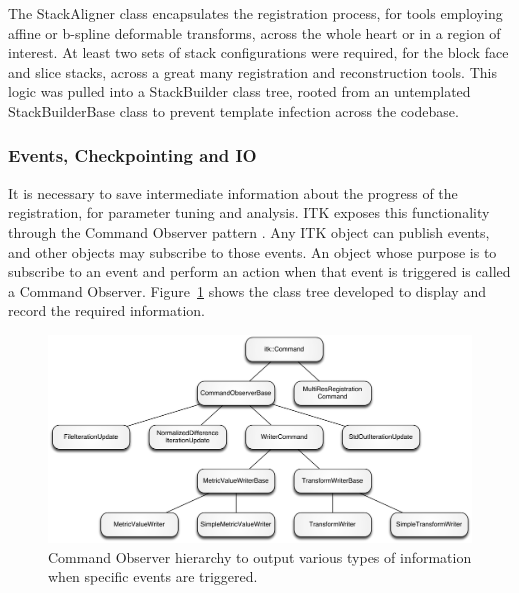 			The StackAligner class encapsulates the registration process, for tools employing affine or b-spline deformable transforms, across the whole heart or in a region of interest. At least two sets of stack configurations were required, for the block face and slice stacks, across a great many registration and reconstruction tools. This logic was pulled into a StackBuilder class tree, rooted from an untemplated StackBuilderBase class to prevent template infection across the codebase.
		
		\subsubsection{Events, Checkpointing and IO} %
		\label{ssub:events_checkpointing_and_io}
			It is necessary to save intermediate information about the progress of the registration, for parameter tuning and analysis. ITK exposes this functionality through the Command Observer pattern \cite{Gamma1995}. Any ITK object can publish events, and other objects may subscribe to those events. An object whose purpose is to subscribe to an event and perform an action when that event is triggered is called a Command Observer. Figure~\ref{fig:command_hierarchy} shows the class tree developed to display and record the required information.
			
    \begin{figure}[htbp]
      \centering
      \includegraphics[width=\pagewidth]{Ch5/Figs/command_hierarchy}
      \caption{Command Observer hierarchy to output various types of information when specific events are triggered.}
      \label{fig:command_hierarchy}
    \end{figure}
		
